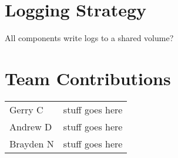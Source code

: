 \documentclass{article}
\begin{document}
	\section{Logging Strategy}
	All components write logs to a shared volume?
	
	\section{Team Contributions}
	\begin{longtable}{p{}p{}}
		Gerry C & stuff goes here\\
		Andrew D & stuff goes here\\
		Brayden N & stuff goes here\\
	\end{longtable}
	
\end{document}

